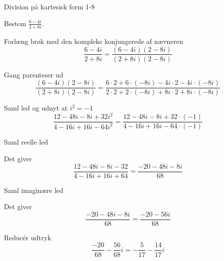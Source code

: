 \documentclass{article}
\begin{document}
\begin{exercise}{Division på kartesisk form 1-8}
	
	Bestem $\frac{6-4i}{2+8i}$.
	
	
	
	\hint 
	
	Forlæng brøk med den kompleks konjungerede af nævneren
	\[
	\frac{6-4i}{2+8i} = \frac{(6-4i)(2-8i)}{(2+8i)(2-8i)}
	\]
	
	\hint
	
	Gang parenteser ud
	\[
	\frac{(6-4i)(2-8i)}{(2+8i)(2-8i)} = \frac{6 \cdot 2 + 6 \cdot (-8i) -4i \cdot 2 -4i \cdot (-8i)}{2 \cdot 2 + 2 \cdot (-8i) + 8i \cdot 2 + 8i \cdot (-8i)}
	\]
	
	\hint 
	
	Saml led og udnyt at $i^2 = -1$
	\[
	\frac{12 -48i -8i+32i^2}{4 -16i +16i -64i^2} = \frac{12 -48i -8i+32 \cdot (-1)}{4 -16i +16i -64 \cdot (-1)} 
	\]
	
	\hint
	
	Saml reelle led
	
	\hint
	
	Det giver
	\[
	\frac{12 -48i -8i-32}{4 -16i +16i +64}  = \frac{-20 -48i-8i}{68}	
	\]
	
	\hint
	
	Saml imaginære led
	
	
	\hint
	
	Det giver 
	\[
	\frac{-20 -48i-8i}{68} = \frac{-20 -56i}{68}
	\]
	
	\hint
	
	Reducér udtryk
	\[
	\frac{-20}{68} - \frac{56}{68}i = -\frac{5}{17} - \frac{14}{17}i
	\]
	
\end{exercise}
\end{document}
